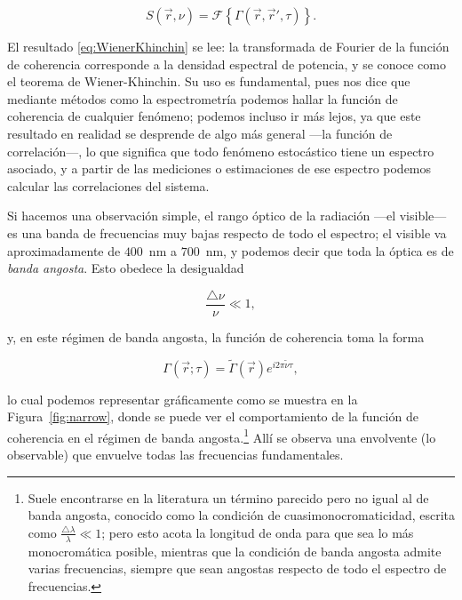 		\begin{equation}\label{eq:WienerKhinchin}
			\boxed{S(\vec{r},\nu) = \mathcal{F}\left\{ \Gamma(\vec{r},\vec{r}',\tau) \right\}}.
		\end{equation}

		El resultado \eqref{eq:WienerKhinchin} se lee: la transformada de Fourier de la función de coherencia corresponde a la densidad espectral de potencia, y se conoce como el teorema de Wiener-Khinchin. Su uso es fundamental, pues nos dice que mediante métodos como la espectrometría podemos hallar la función de coherencia de cualquier fenómeno; podemos incluso ir más lejos, ya que este resultado en realidad se desprende de algo más general —la función de correlación—, lo que significa que todo fenómeno estocástico tiene un espectro asociado, y a partir de las mediciones o estimaciones de ese espectro podemos calcular las correlaciones del sistema.

		Si hacemos una observación simple, el rango óptico de la radiación —el visible— es una banda de frecuencias muy bajas respecto de todo el espectro; el visible va aproximadamente de $400$~nm a $700$~nm, y podemos decir que toda la óptica es de \textit{banda angosta}. Esto obedece la desigualdad

		\begin{equation}
			\frac{\triangle \nu}{\nu} \ll 1,
		\end{equation}

		y, en este régimen de banda angosta, la función de coherencia toma la forma

		\begin{equation}
			\Gamma(\vec{r};\tau) = \tilde{\Gamma}(\vec{r})e^{i2\pi \tilde{\nu}\tau},
		\end{equation}

		lo cual podemos representar gráficamente como se muestra en la Figura~\ref{fig:narrow}, donde se puede ver el comportamiento de la función de coherencia en el régimen de banda angosta.\footnote{Suele encontrarse en la literatura un término parecido pero no igual al de banda angosta, conocido como la condición de cuasimonocromaticidad, escrita como $\frac{\triangle \lambda}{\lambda} \ll 1$; pero esto acota la longitud de onda para que sea lo más monocromática posible, mientras que la condición de banda angosta admite varias frecuencias, siempre que sean angostas respecto de todo el espectro de frecuencias.} Allí se observa una envolvente (lo observable) que envuelve todas las frecuencias fundamentales.

